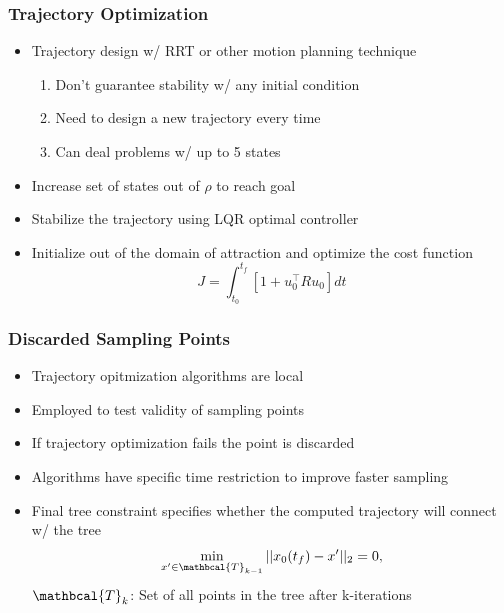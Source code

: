 \documentclass{beamer}
\begin{document}
\begin{frame}
\frametitle{Trajectory Optimization}
\begin{itemize}
\item Trajectory design w/ RRT or other motion planning technique
\begin{enumerate}
\item Don't guarantee stability w/ any initial condition
\item Need to design a new trajectory every  time
\item Can deal problems w/ up to 5 states \vspace{.2cm}
\end{enumerate}
\item Increase set of states out of $\rho$ to reach goal \vspace{.2cm}
\item Stabilize the trajectory using LQR optimal controller\vspace{.2cm}
\item Initialize out of the domain of attraction and optimize the cost function \vspace{.2cm}
\begin{equation*}
J=\int_{t_0}^{t_f}[1+u_0^{\intercal}Ru_0] dt
\end{equation*}
\end{itemize}

\end{frame}


\begin{frame}
\frametitle{Discarded Sampling Points}
\begin{itemize}
\item Trajectory opitmization algorithms are local \vspace{.2cm}
\item Employed to test validity of sampling points \vspace{.2cm}
\item If trajectory optimization fails the point is discarded \vspace{.2cm}
\item Algorithms have specific time restriction to improve faster sampling \vspace{.2cm}
\item Final tree constraint specifies whether the computed trajectory will connect w/ the tree 
\begin{equation*}
\min\limits_{x^{\prime}\in \mathbcal{T}_{k-1}} ||x_0(t_f)-x^{\prime}||_2=0,
\end{equation*}
$\mathbcal{T}_{k}$: Set of all points in the tree after k-iterations
\end{itemize}

\end{frame}
\end{document}
